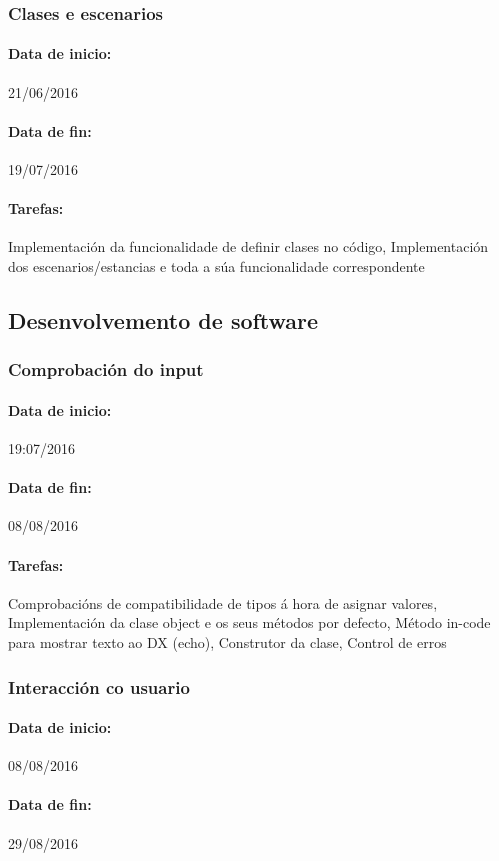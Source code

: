 \subsubsection{Clases e escenarios}
\paragraph{Data de inicio:} 21/06/2016
\paragraph{Data de fin:} 19/07/2016
\paragraph{Tarefas:} Implementación da funcionalidade de definir clases no
código, Implementación dos escenarios/estancias e toda a súa funcionalidade
correspondente


\subsection{Desenvolvemento de software}
\subsubsection{Comprobación do input}
\paragraph{Data de inicio:} 19:07/2016
\paragraph{Data de fin:} 08/08/2016
\paragraph{Tarefas:} Comprobacións de compatibilidade de tipos á hora de asignar
valores, Implementación da clase object e os seus métodos por defecto, Método
in-code para mostrar texto ao DX (echo), Construtor da clase, Control de erros

\subsubsection{Interacción co usuario}
\paragraph{Data de inicio:} 08/08/2016
\paragraph{Data de fin:} 29/08/2016
